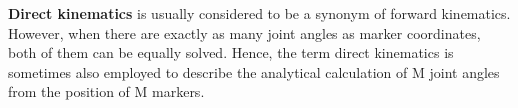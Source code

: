 \textbf{Direct kinematics} is usually considered to be a synonym of forward kinematics. However, when there are exactly as many joint angles as marker coordinates, both of them can be equally solved. Hence, the term direct kinematics is sometimes also employed to describe the analytical calculation of M joint angles from the position of M markers.














